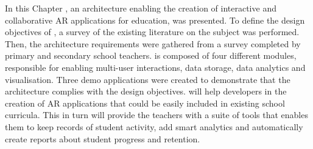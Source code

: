 In this Chapter \arch{}, an architecture enabling the creation of interactive and collaborative AR applications for education, was presented. To define the design objectives of \arch{}, a survey of the existing literature on the subject was performed. Then, the architecture requirements were gathered from a survey completed by primary and secondary school teachers. \arch{} is composed of four different modules, responsible for enabling multi-user interactions, data storage, data analytics and visualisation. Three demo applications were created to demonstrate that the architecture complies with the design objectives. \arch{} will help developers in the creation of AR applications that could be easily included in existing school curricula. This in turn will provide the teachers with a suite of tools that enables them to keep records of student activity, add smart analytics and automatically create reports about student progress and retention. 

\begin{table*}[htb]\centering
\caption{\fontsize{10pt}{11pt}}
\label{tab:summarypoc}
\end{table*}

